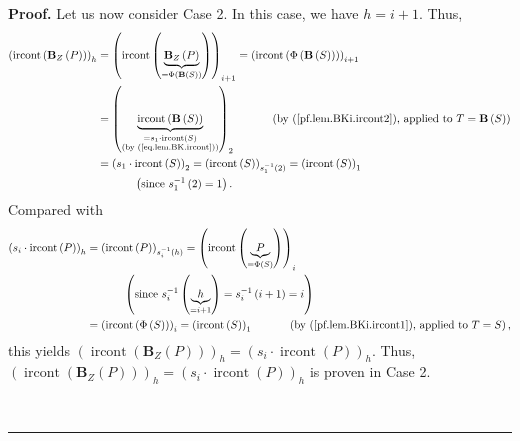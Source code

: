 \documentclass[numbers=enddot,12pt,final,onecolumn,notitlepage]{scrartcl}%
\theoremstyle{definition}
\newenvironment{proof}[1][Proof]{\noindent\textbf{#1.} }{\ \rule{0.5em}{0.5em}}
\newenvironment{verlong}{}{}
\begin{document}
\begin{verlong}
\begin{proof}
Let us now consider Case 2. In this case, we have $h=i+1$. Thus,%
\begin{align*}
\left(  \operatorname*{ircont}\left(  \mathbf{B}_{Z}\left(  P\right)  \right)
\right)  _{h}  &  =\left(  \operatorname*{ircont}\left(
\underbrace{\mathbf{B}_{Z}\left(  P\right)  }_{=\Phi\left(  \mathbf{B}\left(
S\right)  \right)  }\right)  \right)  _{i+1}=\left(  \operatorname*{ircont}%
\left(  \Phi\left(  \mathbf{B}\left(  S\right)  \right)  \right)  \right)
_{i+1}\\
&  =\left(  \underbrace{\operatorname*{ircont}\left(  \mathbf{B}\left(
S\right)  \right)  }_{\substack{=s_{1}\cdot\operatorname*{ircont}\left(
S\right)  \\\text{(by (\ref{eq.lem.BK.ircont}))}}}\right)  _{2}%
\ \ \ \ \ \ \ \ \ \ \left(  \text{by (\ref{pf.lem.BKi.ircont2}), applied to
}T=\mathbf{B}\left(  S\right)  \right) \\
&  =\left(  s_{1}\cdot\operatorname*{ircont}\left(  S\right)  \right)
_{2}=\left(  \operatorname*{ircont}\left(  S\right)  \right)  _{s_{1}%
^{-1}\left(  2\right)  }=\left(  \operatorname*{ircont}\left(  S\right)
\right)  _{1}\\
&  \ \ \ \ \ \ \ \ \ \ \left(  \text{since }s_{1}^{-1}\left(  2\right)
=1\right)  .
\end{align*}
Compared with%
\begin{align*}
\left(  s_{i}\cdot\operatorname*{ircont}\left(  P\right)  \right)  _{h}  &
=\left(  \operatorname*{ircont}\left(  P\right)  \right)  _{s_{i}^{-1}\left(
h\right)  }=\left(  \operatorname*{ircont}\left(  \underbrace{P}_{=\Phi\left(
S\right)  }\right)  \right)  _{i}\\
&  \ \ \ \ \ \ \ \ \ \ \left(  \text{since }s_{i}^{-1}\left(  \underbrace{h}%
_{=i+1}\right)  =s_{i}^{-1}\left(  i+1\right)  =i\right) \\
&  =\left(  \operatorname*{ircont}\left(  \Phi\left(  S\right)  \right)
\right)  _{i}=\left(  \operatorname*{ircont}\left(  S\right)  \right)
_{1}\ \ \ \ \ \ \ \ \ \ \left(  \text{by (\ref{pf.lem.BKi.ircont1}), applied
to }T=S\right)  ,
\end{align*}
this yields $\left(  \operatorname*{ircont}\left(  \mathbf{B}_{Z}\left(
P\right)  \right)  \right)  _{h}=\left(  s_{i}\cdot\operatorname*{ircont}%
\left(  P\right)  \right)  _{h}$. Thus, $\left(  \operatorname*{ircont}\left(
\mathbf{B}_{Z}\left(  P\right)  \right)  \right)  _{h}=\left(  s_{i}%
\cdot\operatorname*{ircont}\left(  P\right)  \right)  _{h}$ is proven in Case 2.


\end{proof}
\end{verlong}
\end{document}
